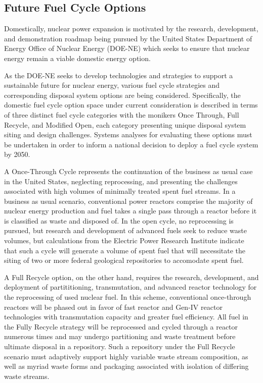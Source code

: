 \subsection{Future Fuel Cycle Options}

Domestically, nuclear power expansion is motivated by the research, 
development, and demonstration roadmap being pursued by the United 
States Department of Energy Office of Nuclear Energy (DOE-NE) which 
seeks to ensure that nuclear energy remain a viable domestic energy 
option.  \cite{department_of_energy_-_nuclear_energy_nuclear_2010} 

As the DOE-NE seeks to develop technologies and strategies to support 
a sustainable future for nuclear energy, various fuel cycle strategies 
and corresponding disposal system options are being considered.  
Specifically, the domestic fuel cycle option space under current 
consideration is described in terms of three distinct fuel cycle 
categories with the monikers Once Through, Full Recycle, and Modified 
Open, each category presenting unique disposal system siting and 
design challenges. Systems analyses for evaluating these options must 
be undertaken in order to inform a national decision to deploy a fuel 
cycle system by 2050.  
\cite{department_of_energy_-_nuclear_energy_nuclear_2010} 

A Once-Through Cycle represents the continuation of the business as 
usual case in the United States,  neglecting reprocessing, and 
presenting the challenges associated with high volumes of minimally 
treated spent fuel streams.  In a business as usual scenario, 
conventional power reactors comprise the majority of nuclear energy 
production and fuel takes a single pass through a reactor before it is 
classified as waste and disposed of. In the open cycle, no 
reprocessing is pursued, but research and development of advanced 
fuels seek to reduce waste volumes, but calculations from the Electric 
Power Research Institute indicate that such a cycle will generate a 
volume of spent fuel that will necessitate the siting of two or more 
federal  geological repositories to accomodate spent fuel.  
\cite{kessler_room_2006} 

A Full Recycle option, on the other hand, requires the research, 
development, and deployment of partititioning, transmutation, and 
advanced reactor technology for the reprocessing of used nuclear fuel.  
In this scheme, conventional once-through reactors will be phased out 
in favor of fast reactor and Gen-IV reactor technologies with 
transmutation capacity and greater fuel efficiency. All fuel in the 
Fully Recycle strategy will be reprocessed and cycled through a 
reactor numerous times and may undergo partitioning and waste 
treatment before ultimate disposal in a repository. Such a repository 
under the Full Recycle scenario must adaptively support highly 
variable waste stream composition, as well as myriad waste forms and 
packaging associated with isolation of differing waste streams.

